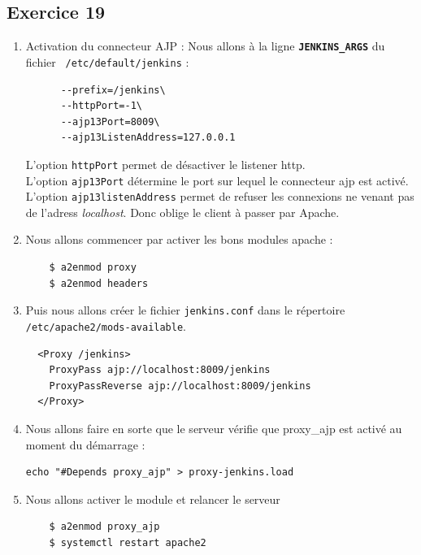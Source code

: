 \documentclass{report}
\begin{document}
\subsection{Exercice 19}
\begin{enumerate}
  \item Activation du connecteur AJP :
  Nous allons à la ligne \texttt{\textbf{JENKINS\_ARGS}} du fichier \texttt{
  /etc/default/jenkins} :
  \begin{tcolorbox}
    \begin{verbatim}
      --prefix=/jenkins\
      --httpPort=-1\
      --ajp13Port=8009\
      --ajp13ListenAddress=127.0.0.1
    \end{verbatim}
  \end{tcolorbox}
  L'option \texttt{httpPort} permet de désactiver le listener http.\\
  L'option \texttt{ajp13Port} détermine le port sur lequel le connecteur ajp est activé.
  L'option \texttt{ajp13listenAddress} permet de refuser les connexions ne venant
  pas de l'adress \textit{localhost}. Donc oblige le client à passer par Apache.

\item Nous allons commencer par activer les bons modules apache :

\begin{tcolorbox}
  \begin{verbatim}
    $ a2enmod proxy
    $ a2enmod headers
  \end{verbatim}
\end{tcolorbox}
\item
Puis nous allons créer le fichier \texttt{jenkins.conf} dans le répertoire
\texttt{/etc/apache2/mods-available}.
\begin{tcolorbox}
  \begin{verbatim}
  <Proxy /jenkins>
    ProxyPass ajp://localhost:8009/jenkins
    ProxyPassReverse ajp://localhost:8009/jenkins
  </Proxy>
  \end{verbatim}
\end{tcolorbox}
\item Nous allons faire en sorte que le serveur vérifie que proxy\_ajp est activé
au moment du démarrage :
\begin{tcolorbox}
  \begin{verbatim}
echo "#Depends proxy_ajp" > proxy-jenkins.load
  \end{verbatim}
\end{tcolorbox}
\item Nous allons activer le module et relancer le serveur
\begin{tcolorbox}
  \begin{verbatim}
    $ a2enmod proxy_ajp
    $ systemctl restart apache2
  \end{verbatim}
\end{tcolorbox}
\end{enumerate}
\end{document}

